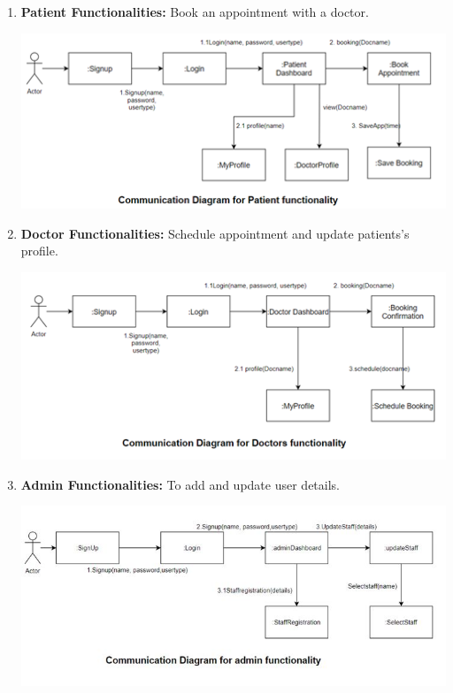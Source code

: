 \documentclass[a4paper,12pt]{report}
\begin{document}
\begin{enumerate}
    \item \textbf{Patient Functionalities:} Book an appointment with a doctor.
        \begin{center}
            \includegraphics{UML/patient.png}    
        \end{center}
    
    \item \textbf{Doctor Functionalities:} Schedule appointment and update patients’s profile.
        \begin{center}
            \includegraphics{UML/doctor.png}    
        \end{center}
        
    \item \textbf{Admin Functionalities:} To add and update user details.
        \begin{center}
            \includegraphics{UML/admin.JPG}
        \end{center}
\end{enumerate}
\end{document}
